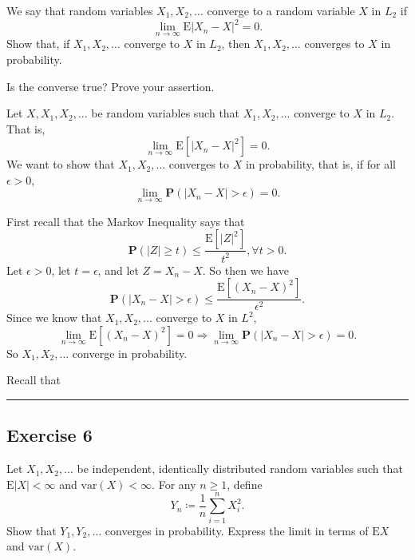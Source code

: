 \documentclass{article}
\theoremstyle{break}
\renewenvironment{proof}{{\bf Proof:}}{\hfill\rule{2mm}{2mm}}
\newcommand{\E}{\mathrm{E}}
\renewcommand{\P}{\mathbf{P}}
\begin{document}
We say that random variables $X_{1},X_{2},\ldots$ converge to a random variable $X$ in $L_{2}$ if
\[\lim_{n\to\infty}\E|X_{n}-X|^{2}=0.\]
Show that, if $X_{1},X_{2},\ldots$ converge to $X$ in $L_{2}$, then $X_{1},X_{2},\ldots$ converges to $X$ in probability.

Is the converse true?  Prove your assertion.

\begin{proof}
  Let $X, X_1, X_2, ...$ be random variables such that $X_1, X_2, ...$ converge to $X$ in $L_2$. That is,
  \[
    \lim_{n \rightarrow \infty} \E[ |X_n - X|^2] = 0.
  \]
  We want to show that $X_1, X_2, ...$ converges to $X$ in probability, that is, if for all $\epsilon > 0$,
  \[
    \lim_{n \rightarrow \infty} \P(|X_n - X| > \epsilon) = 0.
  \]

  First recall that the Markov Inequality says that
  \[
    \P(|Z| \geq t) \leq \frac{\E[|Z|^2]}{t^2}, \forall t > 0.
  \]
  Let $\epsilon > 0$, let $t = \epsilon$, and let $Z = X_n - X$. So then we have
  \[
    \P(|X_n - X| > \epsilon) \leq \frac{\E[(X_n - X)^2]}{\epsilon^2}.
  \]
  Since we know that $X_1, X_2, ...$ converge to $X$ in $L^2$,
  \[
    \lim_{n \rightarrow \infty} \E[(X_n - X)^2] = 0 \Rightarrow \lim_{n \rightarrow \infty} \P(|X_n - X| > \epsilon) = 0.
  \]
  So $X_1, X_2, ...$ converge in probability.

  Recall that 

\end{proof}

\subsection*{Exercise 6}


Let $X_{1},X_{2},\ldots$ be independent, identically distributed random variables such that $\E|X|<\infty$ and $\mathrm{var}(X)<\infty$.  For any $n\geq1$, define
\[Y_{n}\coloneqq\frac{1}{n}\sum_{i=1}^{n}X_{i}^{2}.\]
Show that $Y_{1},Y_{2},\ldots$ converges in probability.  Express the limit in terms of $\E X$ and $\mathrm{var}(X)$.
\end{document}
